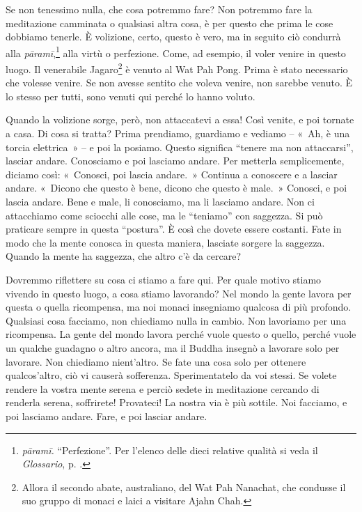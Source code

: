 Se non tenessimo nulla, che cosa potremmo fare? Non potremmo fare la
meditazione camminata o qualsiasi altra cosa, è per questo che prima le
cose dobbiamo tenerle. È volizione, certo, questo è vero, ma in seguito
ciò condurrà alla \emph{pāramī},\footnote{\emph{pāramī.} ``Perfezione''.
  Per l'elenco delle dieci relative qualità si veda il \emph{Glossario}, p. \pageref{glossary-parami}.}
alla virtù o perfezione. Come, ad esempio, il voler venire in questo
luogo. Il venerabile Jagaro\footnote{Allora il secondo abate,
  australiano, del Wat Pah Nanachat, che condusse il suo gruppo di
  monaci e laici a visitare Ajahn Chah.} è venuto al Wat Pah Pong. Prima
è stato necessario che volesse venire. Se non avesse sentito che voleva
venire, non sarebbe venuto. È lo stesso per tutti, sono venuti qui
perché lo hanno voluto.

Quando la volizione sorge, però, non attaccatevi a essa! Così venite, e
poi tornate a casa. Di cosa si tratta? Prima prendiamo, guardiamo e
vediamo -- «~Ah, è una torcia elettrica~» -- e poi la posiamo. Questo
significa ``tenere ma non attaccarsi'', lasciar andare. Conosciamo e poi
lasciamo andare. Per metterla semplicemente, diciamo così: «~Conosci,
poi lascia andare.~» Continua a conoscere e a lasciar andare. «~Dicono
che questo è bene, dicono che questo è male.~» Conosci, e poi lascia
andare. Bene e male, li conosciamo, ma li lasciamo andare. Non ci
attacchiamo come sciocchi alle cose, ma le ``teniamo'' con saggezza. Si
può praticare sempre in questa ``postura''. È così che dovete essere
costanti. Fate in modo che la mente conosca in questa maniera, lasciate
sorgere la saggezza. Quando la mente ha saggezza, che altro c'è da
cercare?

Dovremmo riflettere su cosa ci stiamo a fare qui. Per quale motivo
stiamo vivendo in questo luogo, a cosa stiamo lavorando? Nel mondo la
gente lavora per questa o quella ricompensa, ma noi monaci insegniamo
qualcosa di più profondo. Qualsiasi cosa facciamo, non chiediamo nulla
in cambio. Non lavoriamo per una ricompensa. La gente del mondo lavora
perché vuole questo o quello, perché vuole un qualche guadagno o altro
ancora, ma il Buddha insegnò a lavorare solo per lavorare. Non chiediamo
nient'altro. Se fate una cosa solo per ottenere qualcos'altro, ciò vi
causerà sofferenza. Sperimentatelo da voi stessi. Se volete rendere la
vostra mente serena e perciò sedete in meditazione cercando di renderla
serena, soffrirete! Provateci! La nostra via è più sottile. Noi
facciamo, e poi lasciamo andare. Fare, e poi lasciar andare.


